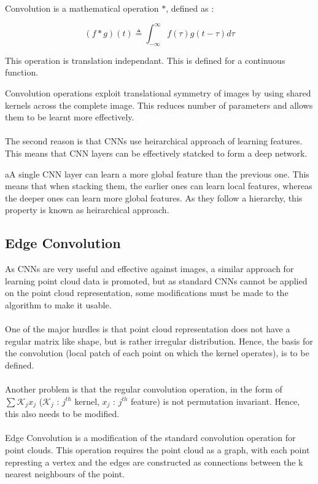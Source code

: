 \begin{definition}
    Convolution is a mathematical operation $*$, defined as :

    \begin{equation*}
        (f*g)(t) \triangleq \int_{-\infty}^{\infty} f(\tau)g(t - \tau) d\tau
    \end{equation*}

    \noindent This operation is translation independant. This is defined for 
    a continuous function.
\end{definition}

\noindent Convolution operations exploit translational symmetry of images 
by using shared kernels across the complete image. This reduces 
number of parameters and allows them to be learnt more effectively.
\\\\
The second reason is that CNNs use heirarchical approach of learning features. 
This means that CNN layers can be effectively statcked to form a deep network.

\begin{note}
    aA single CNN layer can learn a more global feature than the previous one. 
    This means that when stacking them, the earlier ones can learn local 
    features, whereas the deeper ones can learn more global features. As they 
    follow a hierarchy, this property is known as heirarchical approach.
\end{note}

\subsection{Edge Convolution}
As CNNs are very useful and effective against images, a similar approach for 
learning point cloud data is promoted, but as standard CNNs cannot be applied 
on the point cloud representation, some modifications must be made to the 
algorithm to make it usable.
\\\\
One of the major hurdles is that point cloud representation does not have 
a regular matrix like shape, but is rather irregular distribution. Hence, 
the basis for the convolution (local patch of each point on which the 
kernel operates), is to be defined.
\\\\
Another problem is that the regular convolution operation, in the form of 
$\sum \mathcal{K}_jx_j$ ($\mathcal{K}_j$ : $j^{th}$ kernel, $x_j$ : $j^{th}$ 
feature) is not permutation invariant. Hence, this also needs to be 
modified.
\\\\
Edge Convolution is a modification of the standard convolution operation 
for point clouds. This operation requires the point cloud as a graph, with 
each point represting a vertex and the edges are constructed as connections 
between the k nearest neighbours of the point.

